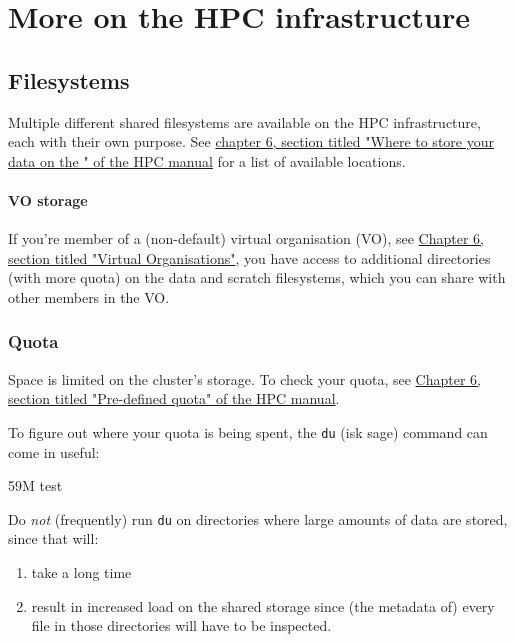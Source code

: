 \chapter{More on the HPC infrastructure}

\section{Filesystems}

Multiple different shared filesystems are available on the HPC infrastructure,
each with their own purpose. See \href{\HPCManualURL#predefined-user-directories}{chapter 6, section titled "Where to store your data on the \hpc{}" of the HPC manual}
for a list of available locations.

\ifgent

\subsubsection{VO storage}

If you're member of a (non-default) virtual organisation (VO), see
\href{\HPCManualURL#sec:virtual-organisation}{Chapter 6, section titled "Virtual Organisations"}, you have access to
additional directories (with more quota) on the data and \gls{scratch} filesystems,
which you can share with other members in the VO.

\fi

\subsection{Quota}

Space is limited on the cluster's storage. To check your quota, see
\href{\HPCManualURL#predefined-quotas}{Chapter 6, section titled "Pre-defined quota" of the HPC manual}.

To figure out where your quota is being spent, the \lstinline|du| (isk sage)
command can come in useful:

\begin{prompt}
59M   test
\end{prompt}

Do \emph{not} (frequently) run \lstinline|du| on directories where large amounts
of data are stored, since that will:
\begin{enumerate}
    \item take a long time
    \item result in increased
        load on the shared storage since (the metadata of) every file in those directories
        will have to be inspected.
\end{enumerate}

